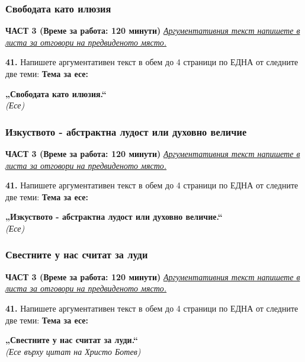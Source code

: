 \documentclass[12pt,a4paper]{article}
\begin{document}
\subsubsection{Свободата като илюзия}
\vspace{0.5cm}
\begin{center}
\textbf{ЧАСТ 3 (Време за работа: 120 минути)}
\vspace{0.2cm}
{\textit{\underline{Аргументативния текст напишете в листа за отговори на предвиденото място.}}}
\vspace{0.1cm}
\end{center}
\textbf{41.} Напишете аргументативен текст в обем до 4 страници по ЕДНА от следните две теми:
\vspace{0.2cm}
\textbf{Тема за есе:}
\vspace{0.1cm}
\begin{center}
\textbf{„Свободата като илюзия.“}
\\
\textit{(Есе)}
\end{center}

\subsubsection{Изкуството - абстрактна лудост или духовно величие}
\vspace{0.5cm}
\begin{center}
\textbf{ЧАСТ 3 (Време за работа: 120 минути)}
\vspace{0.2cm}
{\textit{\underline{Аргументативния текст напишете в листа за отговори на предвиденото място.}}}
\vspace{0.1cm}
\end{center}
\textbf{41.} Напишете аргументативен текст в обем до 4 страници по ЕДНА от следните две теми:
\vspace{0.2cm}
\textbf{Тема за есе:}
\vspace{0.1cm}
\begin{center}
\textbf{„Изкуството - абстрактна лудост или духовно величие.“}
\\
\textit{(Есе)}
\end{center}

\subsubsection{Свестните у нас считат за луди}
\vspace{0.5cm}
\begin{center}
\textbf{ЧАСТ 3 (Време за работа: 120 минути)}
\vspace{0.2cm}
{\textit{\underline{Аргументативния текст напишете в листа за отговори на предвиденото място.}}}
\vspace{0.1cm}
\end{center}
\textbf{41.} Напишете аргументативен текст в обем до 4 страници по ЕДНА от следните две теми:
\vspace{0.2cm}
\textbf{Тема за есе:}
\vspace{0.1cm}
\begin{center}
\textbf{„Свестните у нас считат за луди.“}
\\
\textit{(Есе върху цитат на Христо Ботев)}
\end{center}
\end{document}
